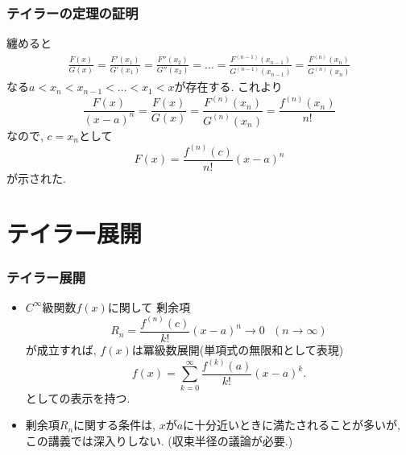 \documentclass[dvipdfmx,cjk,10.2pt]{beamer}
\theoremstyle{definition}
\begin{document}



\begin{frame}
\frametitle{テイラーの定理の証明}

纏めると
\begin{align*}
\frac{F(x)}{G(x)}=\frac{F'(x_1)}{G'(x_1)}
=\frac{F''(x_2)}{G''(x_2)}=\dots =\frac{F^{(n-1)}(x_{n-1})}{G^{(n-1)}(x_{n-1})}=\frac{F^{(n)}(x_{n})}{G^{(n)}(x_{n})}
\end{align*}
なる$a<x_{n}<x_{n-1}<\dots<x_1<x$が存在する. 
これより
$$
\frac{F(x)}{(x-a)^n}=\frac{F(x)}{G(x)}=\frac{F^{(n)}(x_{n})}{G^{(n)}(x_{n})}=\frac{f^{(n)}(x_n)}{n!}
$$
なので, $c=x_n$として
$$
F(x)=\frac{f^{(n)}(c)}{n!}(x-a)^n
$$
が示された. 

\end{frame}





\section{テイラー展開}

\begin{frame}
\frametitle{テイラー展開}


\begin{itemize}
\item $C^\infty$級関数$f(x)$に関して
剰余項
$$
R_n=\frac{f^{(n)}(c)}{k!}(x-a)^n \rightarrow 0 \ \ \ (n \rightarrow \infty)
$$
が成立すれば, $f(x)$は冪級数展開(単項式の無限和として表現)
$$
f(x) = \sum_{k=0}^{\infty}\frac{f^{(k)}(a)}{k!}(x-a)^k. 
$$
としての表示を持つ.  
\item 剰余項$R_n$に関する条件は, $x$が$a$に十分近いときに満たされることが多いが, この講義では深入りしない. (収束半径の議論が必要.)
\end{itemize}

\end{frame}


\end{document}
